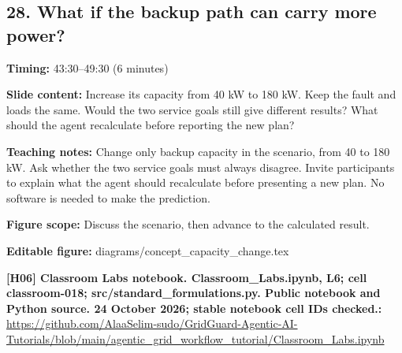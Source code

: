\documentclass[10pt,letterpaper]{article}
\begin{document}
\subsection*{28. What if the backup path can carry more power?}
\textbf{Timing:} 43:30--49:30 (6 minutes)\par
\textbf{Slide content:} Increase its capacity from 40 kW to 180 kW. Keep the fault and loads the same.
Would the two service goals still give different results?
What should the agent recalculate before reporting the new plan?\par
\textbf{Teaching notes:} Change only backup capacity in the scenario, from 40 to 180 kW. Ask whether the two service goals must always disagree. Invite participants to explain what the agent should recalculate before presenting a new plan. No software is needed to make the prediction.\par
\textbf{Figure scope:} Discuss the scenario, then advance to the calculated result.\par
\textbf{Editable figure:} diagrams/concept\_capacity\_change.tex\par
\textbf{[H06] Classroom Labs notebook. Classroom\_Labs.ipynb, L6; cell classroom-018; src/standard\_formulations.py. Public notebook and Python source. 24 October 2026; stable notebook cell IDs checked.:} \href{https://github.com/AlaaSelim-sudo/GridGuard-Agentic-AI-Tutorials/blob/main/agentic_grid_workflow_tutorial/Classroom_Labs.ipynb}{\small\ttfamily https:/\allowbreak{}/\allowbreak{}github.\allowbreak{}com/\allowbreak{}AlaaSelim-\allowbreak{}sudo/\allowbreak{}GridGuard-\allowbreak{}Agentic-\allowbreak{}AI-\allowbreak{}Tutorials/\allowbreak{}blob/\allowbreak{}main/\allowbreak{}agentic\_\allowbreak{}grid\_\allowbreak{}workflow\_\allowbreak{}tutorial/\allowbreak{}Classroom\_\allowbreak{}Labs.\allowbreak{}ipynb}\par
\par\medskip
\end{document}
